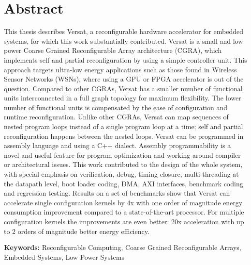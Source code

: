 
\section*{Abstract}


This thesis describes Versat, a reconfigurable hardware accelerator
for embedded systems, for which this work substantially contributed.
Versat is a small and low power Coarse Grained Reconfigurable Array
architecture (CGRA), which implements self and partial reconfiguration
by using a simple controller unit. This approach targets ultra-low
energy applications such as those found in Wireless Sensor Networks
(WSNs), where using a GPU or FPGA accelerator is out of the
question. Compared to other CGRAs, Versat has a smaller number of
functional units interconnected in a full graph topology for maximum
flexibility. The lower number of functional units is compensated by
the ease of configuration and runtime reconfiguration. Unlike other
CGRAs, Versat can map sequences of nested program loops instead of a
single program loop at a time; self and partial reconfiguration
happens between the nested loops. Versat can be programmed in assembly
language and using a C++ dialect. Assembly programmability is a novel
and useful feature for program optimization and working around
compiler or architectural issues. This work contributed to the design
of the whole system, with special emphasis on verification, debug,
timing closure, multi-threading at the datapath level, boot loader
coding, DMA, AXI interfaces, benchmark coding and regression testing.
Results on a set of benchmarks show that Versat can accelerate single
configuration kernels by 4x with one order of magnitude energy
consumption improvement compared to a state-of-the-art processor. For
multiple configuration kernels the improvements are even better: 20x
acceleration with up to 2 orders of magnitude better energy
efficiency.

\vfill

\textbf{\Large Keywords:} Reconfigurable Computing, Coarse Grained
Reconfigurable Arrays, Embedded Systems, Low Power Systems

